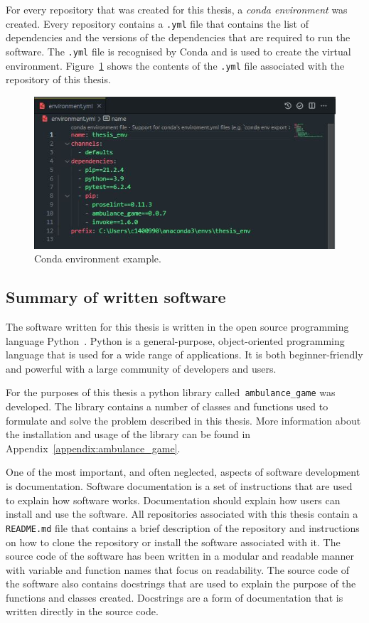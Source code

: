 For every repository that was created for this thesis, a
\textit{conda environment} was created.
Every repository contains a \texttt{.yml} file that contains the list of
dependencies and the versions of the dependencies that are required to run the
software.
The \texttt{.yml} file is recognised by Conda and is used to create the virtual
environment.
Figure~\ref{fig:conda_environment} shows the contents of the \texttt{.yml} file
associated with the repository of this thesis.

\begin{figure}[H]
    \includegraphics[width=\linewidth]{chapters/01_introduction/Bin/environment.JPG}
    \caption{Conda environment example.}
    \label{fig:conda_environment}
\end{figure}



\subsection{Summary of written software}

The software written for this thesis is written in the open source programming
language Python~\cite{van1995python}.
Python is a general-purpose, object-oriented programming language that is used
for a wide range of applications.
It is both beginner-friendly and powerful with a large community of developers
and users.

For the purposes of this thesis a python library called~\texttt{ambulance\_game}
was developed.
The library contains a number of classes and functions used to formulate and
solve the problem described in this thesis.
More information about the installation and usage of the library can be found
in Appendix~\ref{appendix:ambulance_game}.

One of the most important, and often neglected, aspects of software development
is documentation.
Software documentation is a set of instructions that are used to explain how
software works.
Documentation should explain how users can install and use the software.
All repositories associated with this thesis contain a \texttt{README.md} file
that contains a brief description of the repository and instructions on how to
clone the repository or install the software associated with it.
The source code of the software has been written in a modular and readable
manner with variable and function names that focus on readability.
The source code of the software also contains docstrings that are used to
explain the purpose of the functions and classes created.
Docstrings are a form of documentation that is written directly in the source
code.


